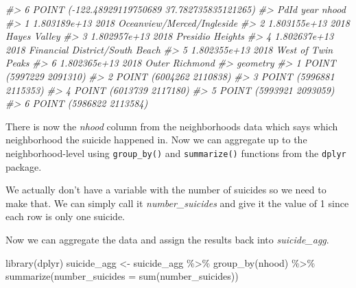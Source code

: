\documentclass[
]{krantz}
\makeatletter
\newenvironment{Shaded}{\begin{snugshade}}{\end{snugshade}}
\newcommand{\AttributeTok}[1]{\textcolor[rgb]{0.61,0.61,0.61}{#1}}
\newcommand{\CommentTok}[1]{\textcolor[rgb]{0.37,0.37,0.37}{\textit{#1}}}
\newcommand{\DecValTok}[1]{\textcolor[rgb]{0.06,0.06,0.06}{#1}}
\newcommand{\FunctionTok}[1]{\textcolor[rgb]{0,0,0}{#1}}
\newcommand{\NormalTok}[1]{#1}
\newcommand{\OtherTok}[1]{\textcolor[rgb]{0.37,0.37,0.37}{#1}}
\newcommand{\SpecialCharTok}[1]{\textcolor[rgb]{0,0,0}{#1}}
\newenvironment{kframe}{%
\medskip{}
\setlength{\fboxsep}{.8em}
 \def\at@end@of@kframe{}%
 \ifinner\ifhmode%
  \def\at@end@of@kframe{\end{minipage}}%
  \begin{minipage}{\columnwidth}%
 \fi\fi%
 \def\FrameCommand##1{\hskip\@totalleftmargin \hskip-\fboxsep
 \colorbox{shadecolor}{##1}\hskip-\fboxsep
     \hskip-\linewidth \hskip-\@totalleftmargin \hskip\columnwidth}%
 \MakeFramed {\advance\hsize-\width
   \@totalleftmargin\z@ \linewidth\hsize
   \@setminipage}}%
 {\par\unskip\endMakeFramed%
 \at@end@of@kframe}
\renewenvironment{Shaded}{\begin{kframe}}{\end{kframe}}
\makeatother
\begin{document}
\begin{Shaded}
\begin{Highlighting}[]
\CommentTok{\#\textgreater{} 6 POINT ({-}122.48929119750689 37.782735835121265)}
\CommentTok{\#\textgreater{}           PdId year                          nhood}
\CommentTok{\#\textgreater{} 1 1.803189e+13 2018     Oceanview/Merced/Ingleside}
\CommentTok{\#\textgreater{} 2 1.803155e+13 2018                   Hayes Valley}
\CommentTok{\#\textgreater{} 3 1.802957e+13 2018               Presidio Heights}
\CommentTok{\#\textgreater{} 4 1.802637e+13 2018 Financial District/South Beach}
\CommentTok{\#\textgreater{} 5 1.802355e+13 2018             West of Twin Peaks}
\CommentTok{\#\textgreater{} 6 1.802365e+13 2018                 Outer Richmond}
\CommentTok{\#\textgreater{}                  geometry}
\CommentTok{\#\textgreater{} 1 POINT (5997229 2091310)}
\CommentTok{\#\textgreater{} 2 POINT (6004262 2110838)}
\CommentTok{\#\textgreater{} 3 POINT (5996881 2115353)}
\CommentTok{\#\textgreater{} 4 POINT (6013739 2117180)}
\CommentTok{\#\textgreater{} 5 POINT (5993921 2093059)}
\CommentTok{\#\textgreater{} 6 POINT (5986822 2113584)}
\end{Highlighting}
\end{Shaded}

There is now the \emph{nhood} column from the neighborhoods
data which says which neighborhood the suicide happened in.
Now we can aggregate up to the neighborhood-level using
\texttt{group\_by()} and \texttt{summarize()} functions from
the \texttt{dplyr} package.

We actually don't have a variable with the number of
suicides so we need to make that. We can simply call it
\emph{number\_suicides} and give it the value of 1 since
each row is only one suicide.

\begin{Shaded}
\end{Shaded}

Now we can aggregate the data and assign the results back
into \emph{suicide\_agg}.

\begin{Shaded}
\begin{Highlighting}[]
\FunctionTok{library}\NormalTok{(dplyr)}
\NormalTok{suicide\_agg }\OtherTok{\textless{}{-}}\NormalTok{ suicide\_agg }\SpecialCharTok{\%\textgreater{}\%}
  \FunctionTok{group\_by}\NormalTok{(nhood) }\SpecialCharTok{\%\textgreater{}\%}
  \FunctionTok{summarize}\NormalTok{(}\AttributeTok{number\_suicides =} \FunctionTok{sum}\NormalTok{(number\_suicides))}
\end{Highlighting}
\end{Shaded}
\end{document}
